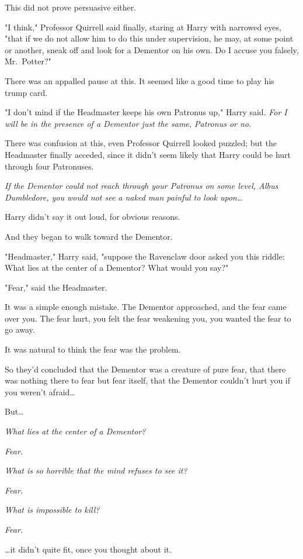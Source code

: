 This did not prove persuasive either.

"I think," Professor Quirrell said finally, staring at Harry with narrowed
eyes, "that if we do not allow him to do this under supervision, he may, at
some point or another, sneak off and look for a Dementor on his own. Do I
accuse you falsely, Mr.~Potter?"

There was an appalled pause at this. It seemed like a good time to play his
trump card.

"I don't mind if the Headmaster keeps his own Patronus up," Harry said.
\emph{For I will be in the presence of a Dementor just the same, Patronus or
no.}

There was confusion at this, even Professor Quirrell looked puzzled; but the
Headmaster finally acceded, since it didn't seem likely that Harry could be
hurt through four Patronuses.

\emph{If the Dementor could not reach through your Patronus on some level,
Albus Dumbledore, you would not see a naked man painful to look upon{\ldots}}

Harry didn't say it out loud, for obvious reasons.

And they began to walk toward the Dementor.

"Headmaster," Harry said, "suppose the Ravenclaw door asked you this riddle:
What lies at the center of a Dementor? What would you say?"

"Fear," said the Headmaster.

It was a simple enough mistake. The Dementor approached, and the fear came over
you. The fear hurt, you felt the fear weakening you, you wanted the fear to go
away.

It was natural to think the fear was the problem.

So they'd concluded that the Dementor was a creature of pure fear, that there
was nothing there to fear but fear itself, that the Dementor couldn't hurt you
if you weren't afraid{\ldots}

But{\ldots}

\emph{What lies at the center of a Dementor?}

\emph{Fear.}

\emph{What is so horrible that the mind refuses to see it?}

\emph{Fear.}

\emph{What is impossible to kill?}

\emph{Fear.}

{\ldots}it didn't quite fit, once you thought about it.

